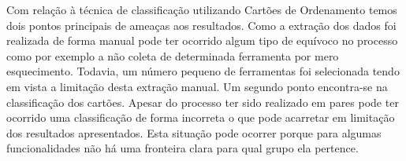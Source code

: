 Com relação à técnica de classificação utilizando Cartões de Ordenamento temos
dois pontos principais de ameaças aos resultados. Como a extração dos dados foi
realizada de forma manual pode ter ocorrido algum tipo de equívoco no processo
como por exemplo a  não coleta de determinada ferramenta por mero esquecimento.
Todavia, um número pequeno de ferramentas foi selecionada tendo em vista a
limitação desta extração manual. Um segundo ponto encontra-se na classificação
dos cartões. Apesar do processo ter sido realizado em pares pode ter ocorrido
uma classificação de forma incorreta o que pode acarretar em limitação dos
resultados apresentados. Esta situação pode ocorrer porque para algumas
funcionalidades não há uma fronteira clara para qual grupo ela pertence.

